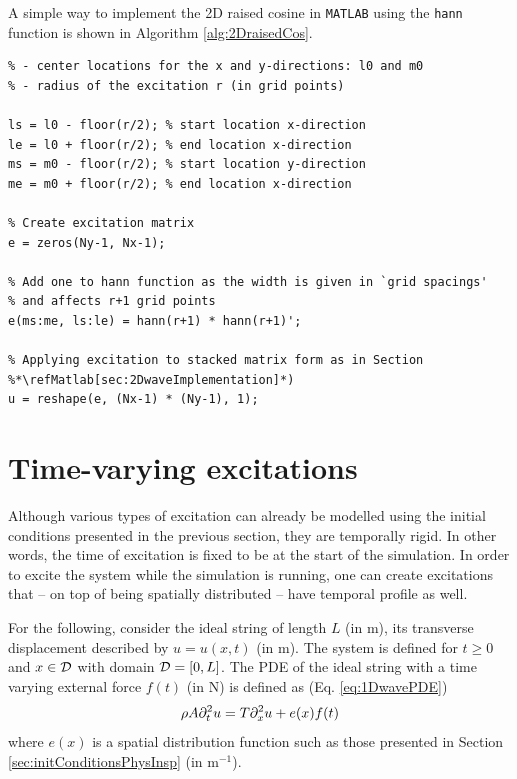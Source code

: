 A simple way to implement the 2D raised cosine in \texttt{MATLAB} using the \texttt{hann} function is shown in Algorithm \ref{alg:2DraisedCos}.
\\
\begin{lstlisting}[caption={A \texttt{MATLAB} implementation of a 2D raised cosine.}, label=alg:2DraisedCos]
% Assuming Dirichlet boundary conditions and having initialised the following
% - center locations for the x and y-directions: l0 and m0
% - radius of the excitation r (in grid points)

ls = l0 - floor(r/2); % start location x-direction
le = l0 + floor(r/2); % end location x-direction
ms = m0 - floor(r/2); % start location y-direction
me = m0 + floor(r/2); % end location x-direction

% Create excitation matrix
e = zeros(Ny-1, Nx-1);

% Add one to hann function as the width is given in `grid spacings'
% and affects r+1 grid points
e(ms:me, ls:le) = hann(r+1) * hann(r+1)';

% Applying excitation to stacked matrix form as in Section %*\refMatlab[sec:2DwaveImplementation]*)
u = reshape(e, (Nx-1) * (Ny-1), 1);
\end{lstlisting} 

\section{Time-varying excitations}
Although various types of excitation can already be modelled using the initial conditions presented in the previous section, they are temporally rigid. In other words, the time of excitation is fixed to be at the start of the simulation. In order to excite the system while the simulation is running, one can create excitations that -- on top of being spatially distributed -- have temporal profile as well.

For the following, consider the ideal string of length $L$ (in m), its transverse displacement described by $u = u(x,t)$ (in m). The system is defined for $t\geq 0$ and $x\in\mathcal{D}$ with domain $\mathcal{D} = [0, L]$. The PDE of the ideal string with a time varying external force $f(t)$ (in N) is defined as (Eq. \eqref{eq:1DwavePDE})
\begin{equation}
    \rho A\partial_t^2 u = T \partial_x^2 u + e(x)f(t)
\end{equation}
where $e(x)$ is a spatial distribution function such as those presented in Section \ref{sec:initConditionsPhysInsp} (in m$^{-1}$).

